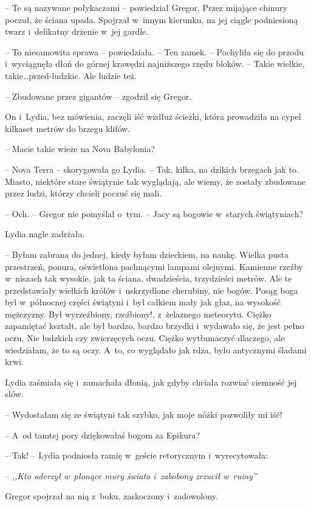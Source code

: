 \documentclass[oneside,polish,12pt,sfheadings]{mwbk}
\begin{document}
-- Te są nazywane połykaczami -- powiedział Gregor. Przez mijające chmury
poczuł, że ściana upada. Spojrzał w~innym kierunku, na jej ciągle
podniesioną twarz i~delikatny drżenie w~jej gardle.

-- To niesamowita sprawa -- powiedziała. -- Ten zamek. -- Pochyliła się do
przodu i~wyciągnęła dłoń do górnej krawędzi najniższego rzędu bloków. --
Takie wielkie, takie\ldots przed-ludzkie. Ale ludzie też.

-- Zbudowane przez gigantów -- zgodził się Gregor.

On i~Lydia, bez mówienia, zaczęli iść wzdłuż ścieżki, która prowadziła
na cypel kilkaset metrów do brzegu klifów. 

-- Macie takie wieże na Nova
Babylonia?

-- Nova Terra -- skorygowała go Lydia. -- Tak, kilka, na dzikich brzegach
jak to. Miasto, niektóre stare świątynie tak wyglądają, ale wiemy, że
zostały zbudowane przez ludzi, którzy chcieli poczuć się mali.

-- Och. -- Gregor nie pomyślał o~tym. -- Jacy są bogowie w~starych
świątyniach?

Lydia nagle zadrżała. 

-- Byłam zabrana do jednej, kiedy byłam dzieckiem,
na naukę. Wielka pusta przestrzeń, ponura, oświetlona pachnącymi lampami
olejnymi. Kamienne rzeźby w~niszach tak wysokie, jak ta ściana,
dwadzieścia, trzydzieści metrów. Ale te przedstawiały wielkich królów i~uskrzydlone cherubiny, nie bogów. Posąg boga był w~północnej części
świątyni i~był całkiem mały jak głaz, na wysokość mężczyzny. Był
wyrzeźbiony, rzeźbiony!, z~żelaznego meteorytu. Ciężko zapamiętać
kształt, ale był bardzo, bardzo brzydki i~wydawało się, że jest pełno
oczu. Nie ludzkich czy zwierzęcych oczu. Ciężko wytłumaczyć dlaczego,
ale wiedziałam, że to są oczy. A~to, co wyglądało jak rdza, było
antycznymi śladami krwi.

Lydia zaśmiała się i~zamachała dłonią, jak gdyby chciała rozwiać
ciemność jej słów. 

-- Wydostałam się ze świątyni tak szybko, jak moje
nóżki pozwoliły mi iść!

-- A~od tamtej pory dziękowałaś bogom za Epikura?

-- Tak! -- Lydia podniosła ramię w~geście retorycznym i~wyrecytowała:

-- \emph{,,Kto uderzył w~płonące mury świata i~zabobony zrzucił w~ruiny''}

Gregor spojrzał na nią z~boku, zaskoczony i~zadowolony. 
\end{document}
